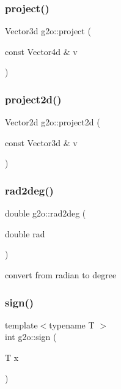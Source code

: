 \mbox{\label{namespaceg2o_a3d337768fe9db907df691e3624ca4e1e}} 
\subsubsection{\texorpdfstring{project()}{project()}\hspace{0.1cm}{\footnotesize\ttfamily [2/2]}}
{\footnotesize\ttfamily Vector3d g2o\+::project (\begin{DoxyParamCaption}\item[{const Vector4d \&}]{v }\end{DoxyParamCaption})\hspace{0.3cm}{\ttfamily [inline]}}

\mbox{\label{namespaceg2o_acc3b6db544c564fb29c4ea60c1fcb775}} 
\subsubsection{\texorpdfstring{project2d()}{project2d()}}
{\footnotesize\ttfamily Vector2d g2o\+::project2d (\begin{DoxyParamCaption}\item[{const Vector3d \&}]{v }\end{DoxyParamCaption})}

\mbox{\label{namespaceg2o_a3965702cbb6051fa2bdb0c75c0358126}} 
\subsubsection{\texorpdfstring{rad2deg()}{rad2deg()}}
{\footnotesize\ttfamily double g2o\+::rad2deg (\begin{DoxyParamCaption}\item[{double}]{rad }\end{DoxyParamCaption})\hspace{0.3cm}{\ttfamily [inline]}}

convert from radian to degree \mbox{\label{namespaceg2o_a821ae3df8a97b37daf8804ef3a26ef1d}} 
\subsubsection{\texorpdfstring{sign()}{sign()}}
{\footnotesize\ttfamily template$<$typename T $>$ \\
int g2o\+::sign (\begin{DoxyParamCaption}\item[{T}]{x }\end{DoxyParamCaption})\hspace{0.3cm}{\ttfamily [inline]}}

